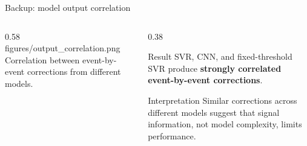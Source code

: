 \begin{frame}{Backup: model output correlation}
\small

\begin{columns}[T,totalwidth=\textwidth]

\begin{column}{0.58\textwidth}
\centering
\smartimage[0.98\linewidth]{0.68\textheight}
{figures/output_correlation.png}
{Correlation between event-by-event corrections from different models.}
\end{column}

\begin{column}{0.38\textwidth}

\begin{block}{Result}
SVR, CNN, and fixed-threshold SVR produce
\textbf{strongly correlated event-by-event corrections}.
\end{block}

\vspace{0.4em}

\begin{alertblock}{Interpretation}
Similar corrections across different models suggest that
signal information, not model complexity, limits performance.
\end{alertblock}

\end{column}
\end{columns}

\end{frame}
